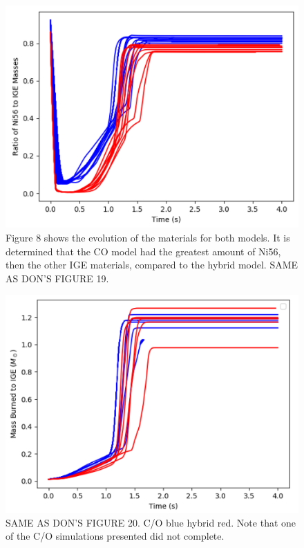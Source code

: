 \documentclass[iop,apj]{emulateapj}
\begin{document}
\begin{figure}
\includegraphics[width=\columnwidth]{figures/compare_ratio_v2.png}
\caption{\label{fig:compare_ratio}
Figure 8 shows the evolution of the materials for both models. It is determined that the CO model had the greatest amount of Ni56, then the other IGE materials, compared to the hybrid model.  
SAME AS DON'S FIGURE 19.
}
\end{figure}

\begin{figure}
\includegraphics[width=\columnwidth]{figures/compare_burned_mass_v2.png}
\caption{\label{fig:compare_burned}
SAME AS DON'S FIGURE 20.
C/O blue hybrid red.
Note that one of the C/O simulations presented did not complete.
}
\end{figure}
\end{document}
